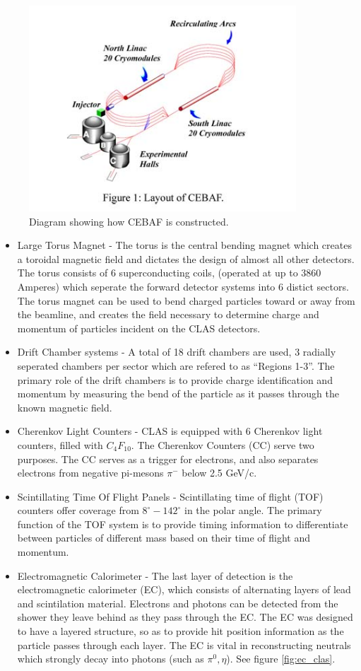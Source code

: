 \begin{figure}
  \centering
  \includegraphics[width=10cm]{image/cebaf.jpg}
  \caption{ Diagram showing how CEBAF is constructed.  }
  \label{fig:jlab}
\end{figure}

\begin{itemize}
\item Large Torus Magnet - The torus is the central bending magnet which creates a toroidal magnetic field and dictates the design of almost all other detectors.  The torus consists of 6 superconducting coils, (operated at up to 3860 Amperes) which seperate the forward detector systems into 6 distict sectors.  The torus magnet can be used to bend charged particles toward or away from the beamline, and creates the field necessary to determine charge and momentum of particles incident on the CLAS detectors.  
\item Drift Chamber systems - A total of 18 drift chambers are used, 3 radially seperated chambers per sector which are refered to as ``Regions 1-3''.  The primary role of the drift chambers is to provide charge identification and momentum by measuring the bend of the particle as it passes through the known magnetic field.    
\item Cherenkov Light Counters - CLAS is equipped with 6 Cherenkov light counters, filled with $C_{4} F_{10}$.  The Cherenkov Counters (CC) serve two purposes.  The CC serves as a trigger for electrons, and also separates electrons from negative pi-mesons $\pi^{-}$ below 2.5 GeV/c.
\item Scintillating Time Of Flight Panels - Scintillating time of flight (TOF) counters offer coverage from $8^{\circ} - 142^{\circ}$ in the polar angle.  The primary function of the TOF system is to provide timing information to differentiate between particles of different mass based on their time of flight and momentum.  
\item Electromagnetic Calorimeter - The last layer of detection is the electromagnetic calorimeter (EC), which consists of alternating layers of lead and scintilation material.  Electrons and photons can be detected from the shower they leave behind as they pass through the EC.  The EC was designed to have a layered structure, so as to provide hit position information as the particle passes through each layer.  The EC is vital in reconstructing neutrals which strongly decay into photons (such as $\pi^0, \eta$). See figure \ref{fig:ec_clas}.  
\end{itemize}

